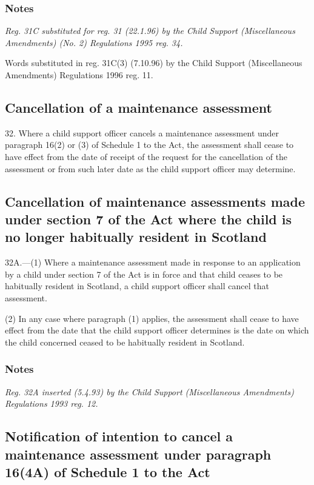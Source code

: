 \documentclass[a4paper]{article}
\newcommand\amendment[1]{\subsubsection*{Notes}{\itshape\frenchspacing\footnotesize #1 \par}}
\begin{document}
\amendment{
Reg. 31C substituted for reg. 31 (22.1.96) by the Child Support (Miscellaneous Amendments) (No. 2) Regulations 1995 reg. 34.

Words substituted in reg. 31C(3) (7.10.96) by the Child Support (Miscellaneous Amendments) Regulations 1996 reg. 11.
}

\subsection[32. Cancellation of a maintenance assessment]{Cancellation of a maintenance assessment}

32.  Where a child support officer cancels a maintenance assessment under paragraph 16(2) or (3) of Schedule 1 to the Act, the assessment shall cease to have effect from the date of receipt of the request for the cancellation of the assessment or from such later date as the child support officer may determine.

\subsection[32A. Cancellation of maintenance assessments made under section 7 of the Act where the child is no longer habitually resident in Scotland]{Cancellation of maintenance assessments made under section 7 of the Act where the child is no longer habitually resident in Scotland}

32A.—(1) Where a maintenance assessment made in response to an application by a child under section 7 of the Act is in force and that child ceases to be habitually resident in Scotland, a child support officer shall cancel that assessment.

(2) In any case where paragraph (1) applies, the assessment shall cease to have effect from the date that the child support officer determines is the date on which the child concerned ceased to be habitually resident in Scotland.

\amendment{
Reg. 32A inserted (5.4.93) by the Child Support (Miscellaneous Amendments) Regulations 1993 reg. 12.
}

\subsection[32B. Notification of intention to cancel a maintenance assessment under paragraph 16(4A) of Schedule 1 to the Act]{Notification of intention to cancel a maintenance assessment under paragraph 16(4A) of Schedule 1 to the Act}
\end{document}
